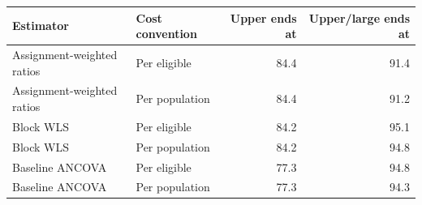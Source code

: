 \begin{tabular}{llrr}
\toprule
Estimator & Cost convention & Upper ends at & Upper/large ends at\\
\midrule
Assignment-weighted ratios & Per eligible & 84.4 & 91.4\\
Assignment-weighted ratios & Per population & 84.4 & 91.2\\
Block WLS & Per eligible & 84.2 & 95.1\\
Block WLS & Per population & 84.2 & 94.8\\
Baseline ANCOVA & Per eligible & 77.3 & 94.8\\
Baseline ANCOVA & Per population & 77.3 & 94.3\\
\bottomrule
\end{tabular}
